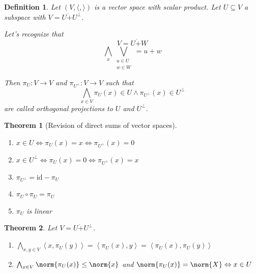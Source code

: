 \documentclass[a4paper,landscape,twocolumn]{article}
\newcommand\functional[1]{\left\langle{#1}\right\rangle}
\newtheorem{theorem}{Theorem}
\newtheorem{defi}{Definition}
\DeclarePairedDelimiter\norm\lVert\rVert
\begin{document}
\begin{defi}
  Let $(V, \langle, \rangle)$ is a vector space with scalar product.
  Let $U \subseteq V$ a subspace with $V = U \dot{+} U^\bot$.

  Let's recognize that
  \[ V = U \dot{+} W \]
  \[ \bigwedge_{x} \bigvee_{\substack{u \in U \\ w \in W}} = u + w \]

  Then $\pi_U: V \to V$ and $\pi_{U^\bot}: V \to V$ such that
  \[ \bigwedge_{x \in V} \pi_U(x) \in U \land \pi_{U^\bot}(x) \in U^\bot \]
  are called \emph{orthogonal projections} to $U$ and $U^\bot$.

\end{defi}

\begin{theorem}[Revision of direct sums of vector spaces]
  \label{wh-8.49}
  \begin{enumerate}
    \item $x \in U \Leftrightarrow \pi_U(x) = x \Leftrightarrow \pi_{U^{\bot}}(x) = 0$
    \item $x \in U^{\bot} \Leftrightarrow \pi_U(x) = 0 \Leftrightarrow \pi_{U^{\bot}}(x) = x$
    \item $\pi_{U^{\bot}} = \text{id} - \pi_U$
    \item $\pi_U \circ \pi_U = \pi_U$
    \item $\pi_U$ is linear
  \end{enumerate}
\end{theorem}

\begin{theorem}
  \label{satz-8.50}
  Let $V = U \dot{+} U^{\bot}$.
  \begin{enumerate}
    \item $\bigwedge_{x,y \in V} \functional{x, \pi_U(y)} = \functional{\pi_U(x), y} = \functional{\pi_U(x), \pi_U(y)}$
    \item $\bigwedge_{x \in V} \norm{\pi_U(x)} \leq \norm{x}$
      and $\norm{\pi_U(x)} = \norm{X} \Leftrightarrow x \in U$
  \end{enumerate}
\end{theorem}
\end{document}
